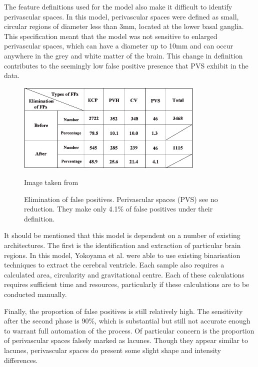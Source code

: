 The feature definitions used for the model also make it difficult to identify perivascular spaces. In this model, perivascular spaces were defined as small, circular regions of diameter less than 3mm, located at the lower basal ganglia. This specification meant that the model was not sensitive to enlarged perivascular spaces, which can have a diameter up to 10mm and can occur anywhere in the grey and white matter of the brain. This change in definition contributes to the seemingly low false positive presence that PVS exhibit in the data.

\begin{figure}[ht]
	\centering
	\includegraphics[width=0.8\textwidth]{Images/4_yokoyama2007testing.png}
	\caption{Elimination of false positives. Perivascular spaces (PVS) see no reduction. They make only 4.1\% of false positives under their definition.}
	\small Image taken from \cite{Yokoyama2007}
\end{figure}

It should be mentioned that this model is dependent on a number of existing architectures. The first is the identification and extraction of particular brain regions. In this model, Yokoyama et al. were able to use existing binarisation techniques to extract the cerebral ventricle. Each sample also requires a calculated area, circularity and gravitational centre. Each of these calculations requires sufficient time and resources, particularly if these calculations are to be conducted manually.

Finally, the proportion of false positives is still relatively high. The sensitivity after the second phase is 90\%, which is substantial but still not accurate enough to warrant full automation of the process. Of particular concern is the proportion of perivascular spaces falsely marked as lacunes. Though they appear similar to lacunes, perivascular spaces do present some slight shape and intensity differences.



